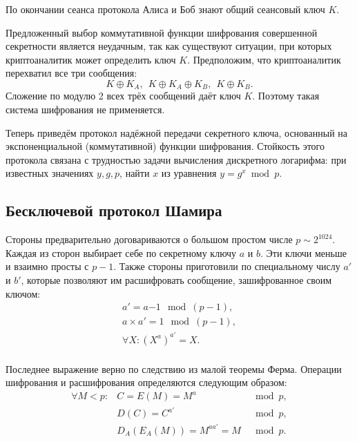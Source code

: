 По окончании сеанса протокола Алиса и Боб знают общий сеансовый ключ $K$.

Предложенный выбор коммутативной функции шифрования совершенной секретности является неудачным, так как существуют ситуации, при которых криптоаналитик может определить ключ $K$. Предположим, что криптоаналитик перехватил все три сообщения:
    \[ K \oplus K_A, ~~ K \oplus K_A \oplus K_B, ~~ K \oplus K_B. \]
Сложение по модулю 2 всех трёх сообщений даёт ключ $K$. Поэтому такая система шифрования не применяется.

Теперь приведём протокол надёжной передачи секретного ключа, основанный на экспоненциальной (коммутативной) функции шифрования. Стойкость этого протокола связана с трудностью задачи вычисления дискретного логарифма: при известных значениях $y, g, p$, найти $x$ из уравнения $y = g^x \bmod p$.

\subsection{Бесключевой протокол Шамира}\label{section-protocols-shamir}

Стороны предварительно договариваются о большом простом числе $p \sim 2^{1024}$. Каждая из сторон выбирает себе по секретному ключу $a$ и $b$. Эти ключи меньше и взаимно просты с $p-1$. Также стороны приготовили по специальному числу $a'$ и $b'$, которые позволяют им расшифровать сообщение, зашифрованное своим ключом:
\[\begin{array}{l}
a' = a{-1} \mod (p-1), \\
a \times a' = 1 \mod (p-1), \\
\forall X: (X^a)^{a'} = X. \\
\end{array}\]

Последнее выражение верно по следствию из малой теоремы Ферма. Операции шифрования и расшифрования определяются следующим образом:
\[\begin{array}{lll}
\forall M < p: & C = E( M ) = M^{a}            & \mod p, \\
               & D( C ) = C^{a'}               & \mod p, \\
               & D_A( E_A( M ) ) = M^{aa'} = M & \mod p. \\
\end{array}\]

